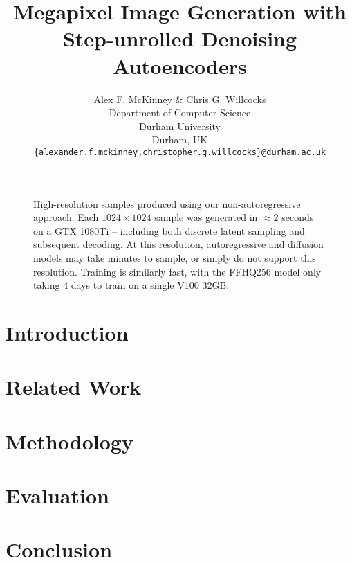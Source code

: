 \documentclass{article} %
\title{Megapixel Image Generation with Step-unrolled Denoising Autoencoders}
\author{Alex F. McKinney \& Chris G. Willcocks \\
Department of Computer Science\\
Durham University\\
Durham, UK \\
\texttt{\{alexander.f.mckinney,christopher.g.willcocks\}@durham.ac.uk} \\
}
\begin{document}
\maketitle

\begin{abstract}
    
\end{abstract}

\begin{figure}[ht]
    \centering
    \caption{
        High-resolution samples produced using our non-autoregressive approach.
        Each $1024 \times 1024$ sample was generated in $\approx 2$ seconds on a
        GTX 1080Ti -- including both discrete latent sampling and subsequent
        decoding. At this resolution, autoregressive and diffusion models may
        take minutes to sample, or simply do not support this resolution.
        Training is similarly fast, with the FFHQ256 model only taking 4 days to
        train on a single V100 32GB.
    }
    \label{fig:main}
\end{figure}

\section{Introduction}\label{sec:intro}


\section{Related Work}\label{sec:related}


\section{Methodology}\label{sec:method}


\section{Evaluation}\label{sec:evaluation}


\section{Conclusion}\label{sec:conclusion}



{\small }
\end{document}
